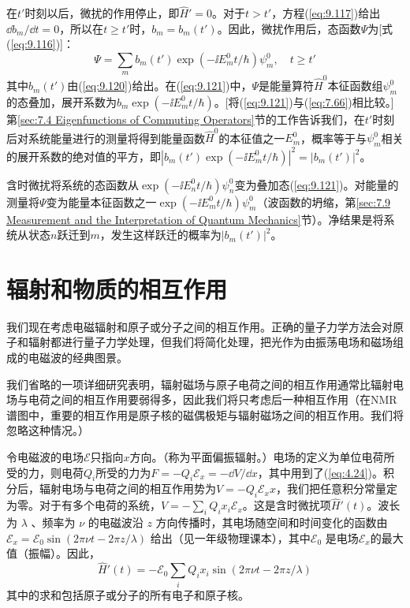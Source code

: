     在$t'$时刻以后，微扰的作用停止，即$\hat{H}'=0$。对于$t > t'$，方程(\ref{eq:9.117})给出$\dd b_m /\dd t = 0$，所以在$t \geq t'$时，$b_m = b_m\left(t'\right)$。因此，微扰作用后，态函数$\Psi$为[式(\ref{eq:9.116})]：
    \begin{equation}
        \Psi = \sum_mb_m\left(t'\right)\exp\left(-\ii E_m^0t/\hbar\right)\psi_m^0, \quad t \geq t'
        \label{eq:9.121}
    \end{equation}
    其中$b_m\left(t'\right)$由(\ref{eq:9.120})给出。在(\ref{eq:9.121})中，$\Psi$是能量算符$\hat{H}^0$本征函数组$\psi_m^0$的态叠加，展开系数为$b_m\exp\left(-\ii E_m^0t/\hbar\right)$。[将(\ref{eq:9.121})与(\ref{eq:7.66})相比较。]第\ref{sec:7.4 Eigenfunctions of Commuting Operators}节的工作告诉我们，在$t'$时刻后对系统能量进行的测量将得到能量函数$\hat{H}^0$的本征值之一$E_m^0$，概率等于与$\psi_m^0$相关的展开系数的绝对值的平方，即$\left|b_m\left(t'\right)\exp\left(-\ii E_m^0t/\hbar\right)\right|^2 = \left|b_m\left(t'\right)\right|^2$。
    
    含时微扰将系统的态函数从$\exp\left(-\ii E_n^0t/\hbar\right)\psi_n^0$变为叠加态(\ref{eq:9.121})。对能量的测量将$\Psi$变为能量本征函数之一$\exp\left(-\ii E_m^0t/\hbar\right)\psi_m^0$（波函数的坍缩，第\ref{sec:7.9 Measurement and the Interpretation of Quantum Mechanics}节）。净结果是将系统从状态$n$跃迁到$m$，发生这样跃迁的概率为$\left|b_m\left(t'\right)\right|^2$。

\section{辐射和物质的相互作用}
\label{sec:9.9 Interaction of Radiation and Matter}

    我们现在考虑电磁辐射和原子或分子之间的相互作用。正确的量子力学方法会对原子和辐射都进行量子力学处理，但我们将简化处理，把光作为由振荡电场和磁场组成的电磁波的经典图景。

    我们省略的一项详细研究表明，辐射磁场与原子电荷之间的相互作用通常比辐射电场与电荷之间的相互作用要弱得多，因此我们将只考虑后一种相互作用（在NMR谱图中，重要的相互作用是原子核的磁偶极矩与辐射磁场之间的相互作用。我们将忽略这种情况。）

    令电磁波的电场$\mathscr{E}$只指向$x$方向。（称为平面偏振辐射。）电场的定义为单位电荷所受的力，则电荷$Q_i$所受的力为$F = -Q_i \mathscr{E}_x = -\dd V /\dd x$，其中用到了(\ref{eq:4.24})。积分后，辐射电场与电荷之间的相互作用势为$V = -Q_i \mathscr{E}_xx$，我们把任意积分常量定为零。对于有多个电荷的系统，$V = -\sum_i Q_i x_i \mathscr{E}_x$。这是含时微扰项$\hat{H}'\left(t\right)$。波长为 $\lambda$ 、频率为 $\nu$ 的电磁波沿 $z$ 方向传播时，其电场随空间和时间变化的函数由 $\mathscr{E}_x = \mathscr{E}_0\sin\left(2\pi\nu t - 2\pi z/\lambda\right)$ 给出（见一年级物理课本），其中$\mathscr{E}_0$ 是电场$\mathscr{E}_x$的最大值（振幅）。因此，
    \begin{equation*}
        \hat{H}'\left(t\right) = -\mathscr{E}_0\sum_i Q_i x_i \sin\left(2\pi\nu t - 2\pi z/\lambda\right)
    \end{equation*}
    其中的求和包括原子或分子的所有电子和原子核。

